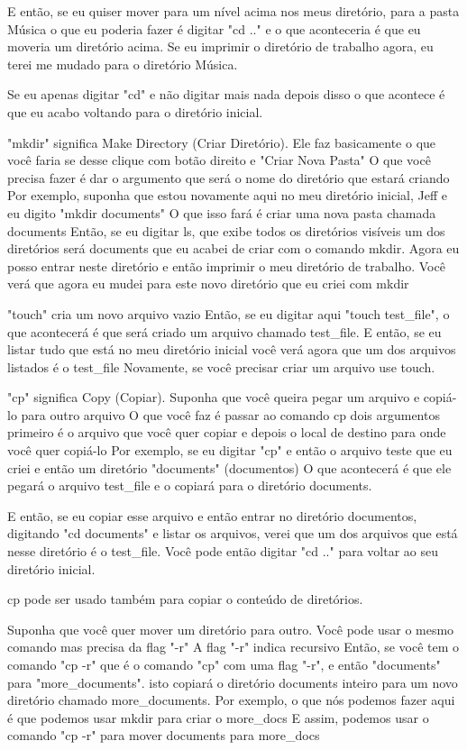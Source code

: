 E então, se eu quiser mover para um nível acima nos meus diretório, para a pasta Música o que eu poderia fazer é digitar "cd .." e o que aconteceria é que eu moveria um diretório acima. Se eu imprimir o diretório de trabalho agora, eu terei me mudado para o diretório Música. 

Se eu apenas digitar "cd" e não digitar mais nada depois disso o que acontece é que eu acabo voltando para o diretório inicial. 

"mkdir" significa Make Directory (Criar Diretório). Ele faz basicamente o que você faria se desse clique com botão direito e "Criar Nova Pasta" O que você precisa fazer é dar o argumento que será o nome do diretório que estará criando Por exemplo, suponha que estou novamente aqui no meu diretório inicial, Jeff e eu digito "mkdir documents" O que isso fará é criar uma nova pasta chamada documents Então, se eu digitar ls, que exibe todos os diretórios visíveis um dos diretórios será documents que eu acabei de criar com o comando mkdir. Agora eu posso entrar  neste diretório e então imprimir o meu diretório de trabalho. Você verá que agora eu mudei para este novo diretório que eu criei com mkdir 

"touch" cria um novo arquivo vazio Então, se eu digitar aqui "touch test\_file", o que acontecerá é que será criado um arquivo chamado test\_file. E então, se eu listar tudo que está no meu diretório inicial você verá agora que um dos arquivos listados é o test\_file Novamente, se você precisar criar um arquivo use touch. 

"cp" significa Copy (Copiar). Suponha que você queira pegar um arquivo e copiá-lo para outro arquivo O que você faz é passar ao comando cp dois argumentos primeiro é o arquivo que você quer copiar e depois o local de destino para onde você quer copiá-lo Por exemplo, se eu digitar "cp" e então o arquivo teste que eu criei e então um diretório "documents" (documentos) O que acontecerá é que ele pegará o arquivo test\_file e o copiará para o diretório documents. 

E então, se eu copiar esse arquivo e então entrar no diretório documentos, digitando "cd documents" e listar os arquivos, verei que um dos arquivos que está nesse diretório é o test\_file. Você pode então digitar "cd .." para voltar ao seu diretório inicial.

cp pode ser usado também para copiar o conteúdo de diretórios. 

Suponha que você quer mover um diretório para outro. Você pode usar o mesmo comando mas precisa da flag "-r" A flag "-r" indica recursivo Então, se você tem o comando "cp -r" que é o comando "cp" com uma flag "-r", e então "documents" para "more\_documents". isto copiará o diretório documents inteiro para um novo diretório chamado more\_documents. Por exemplo, o que nós podemos fazer aqui é que podemos usar mkdir para criar o more\_docs E assim, podemos usar  o comando "cp -r" para mover documents para more\_docs 

